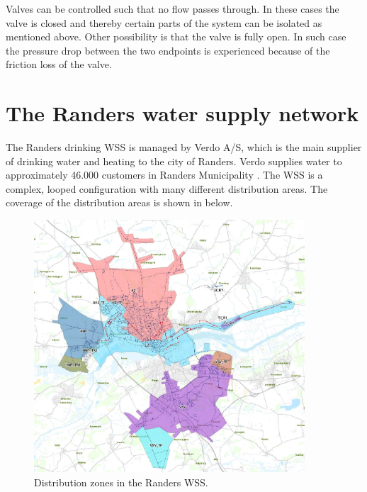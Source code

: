 Valves can be controlled such that no flow passes through. In these cases the valve is closed and thereby certain parts of the system can be isolated as mentioned above. Other possibility is that the valve is fully open. In such case the pressure drop between the two endpoints is experienced because of the friction loss of the valve. 

\newpage

\section{The Randers water supply network}
\label{the_randers_water_supply_network}

The Randers drinking WSS is managed by Verdo A/S, which is the main supplier of drinking water and heating to the city of Randers. Verdo supplies water to approximately 46.000 customers in Randers Municipality \cite{verdo}. The WSS is a complex, looped configuration with many different distribution areas. The coverage of the distribution areas is shown in  below.

\begin{figure}[H]
\centering
\includegraphics[width=0.9\textwidth]{report/pictures/level_zones}
\caption{Distribution zones in the Randers WSS.}
\label{fig:level_zones}
\end{figure}

\vspace{-3mm}

